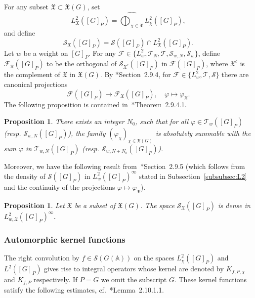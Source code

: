 \documentclass[letterpaper,11pt]{amsart}
\newcommand{\fX}{\mathfrak{X}}
\newcommand{\bA}{\mathbb{A}}
\newcommand{\cF}{\mathcal{F}}
\newcommand{\cS}{\mathcal{S}}
\newcommand{\cT}{\mathcal{T}}
\newcommand{\<}{\negthickspace}
\theoremstyle{definition}
\theoremstyle{plain}
\newtheorem{prop}[definition]{Proposition}
\theoremstyle{remark}
\numberwithin{equation}{section}
\begin{document}
For any subset $\fX \subset \fX(G)$, set
\begin{equation*}
    L^2_{\fX}([G]_P)=\widehat{\bigoplus_{\chi \in \fX}}L^2_{\chi}([G]_P),
\end{equation*}
and define
\begin{equation*}
    \cS_{\fX}([G]_P)=\cS([G]_P) \cap L^2_{\fX}([G]_P).
\end{equation*}
Let $w$ be a weight on $[G]_P$. For any $\cF \in \{L^2_w, \cT_N, \cT, \cS_{w,N}, \cS_w\}$, define $\cF_{\fX}([G]_P)$ to be the orthogonal of $\cS_{\fX^c}([G]_P)$ in $\cF([G]_P)$, where $\fX^c$ is the complement of $\fX$ in $\fX(G)$. By \cite{BPCZ}*{Section~2.9.4}, for $\cF \in \{ L^2_w, \cT, \cS \}$ there are canonical projections
\begin{equation}
    \label{eq:chi_proj}
    \cF([G]_P) \to \cF_{\fX}([G]_P), \quad \varphi \mapsto \varphi_{\fX}.
\end{equation}
The following proposition is contained in~\cite{BPCZ}*{Theorem~2.9.4.1}.

\begin{prop}    \label{prop:absolutely_summable_chi}
There exists an integer $N_0$, such that for all $\varphi \in \cT_w([G]_P)$
(resp. $\cS_{w, N}([G]_P)$), the family $(\varphi_{\chi})_{\chi \in \fX(G)}$
is absolutely summable with the sum $\varphi$ in $\cT_{w, N}([G]_P)$ (resp.
$\cS_{w, N+N_0}([G]_P)$).
\end{prop}

Moreover, we have the following result from~\cite{BPCZ}*{Section~2.9.5} (which follows from the density of $\cS([G]_P)$ in $L^2_{w}([G]_P)^\infty$ stated in Subsection~\ref{subsubsec:L2} and the continuity of the projections $\varphi \mapsto \varphi_\fX$).
\begin{prop}
\label{prop:density_schwartz}
    Let $\fX$ be a subset of $\fX(G)$. The space $\cS_{\fX}([G]_P)$ is dense in $L^2_{w,\fX}([G]_P)^\infty$.
\end{prop}


\subsubsection{Automorphic kernel functions}

The right convolution by $f \in \cS(G(\bA))$ on the spaces $L^2_{\chi}([G]_P)$ and $L^2([G]_P)$ gives rise to integral operators whose kernel are denoted by $K_{f, P, \chi}$ and $K_{f, P}$ respectively. If $P = G$ we omit the subscript $G$.
These kernel functions satisfy the following estimates,
cf.~\cite{BPCZ}*{Lemma~2.10.1.1}.
\end{document}
